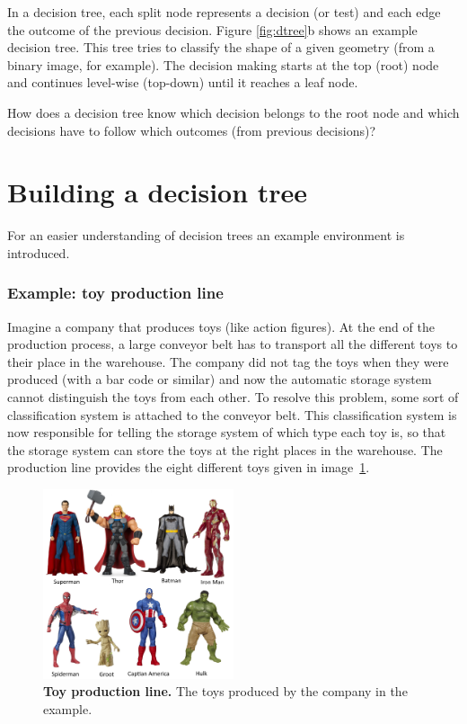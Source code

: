 \documentclass[a4paper]{report}
\begin{document}
    In a decision tree, each split node represents a decision (or test) and each edge the outcome of the previous decision. Figure \ref{fig:dtree}b shows an example decision tree. This tree tries to classify the shape of a given geometry (from a binary image, for example). The decision making starts at the top (root) node and continues level-wise (top-down) until it reaches a leaf node.
    
    How does a decision tree know which decision belongs to the root node and which decisions have to follow which outcomes (from previous decisions)? 
    
    \section{Building a decision tree}
    
    For an easier understanding of decision trees an example environment is introduced.
    
    \subsubsection{Example: toy production line}
    Imagine a company that produces toys (like action figures). At the end of the production process, a large conveyor belt has to transport all the different toys to their place in the warehouse. The company did not tag the toys when they were produced (with a bar code or similar) and now the automatic storage system cannot distinguish the toys from each other. To resolve this problem, some sort of classification system is attached to the conveyor belt. This classification system is now responsible for telling the storage system of which type each toy is, so that the storage system can store the toys at the right places in the warehouse.
    The production line provides the eight different toys given in image~\ref{fig:collection}.
    
    \begin{figure}
    \centering
    \includegraphics[width=0.5\textwidth]{collection}
    \caption{\textbf{Toy production line.} The toys produced by the company in the example.}
    \label{fig:collection}
    \end{figure}
    
\end{document}
